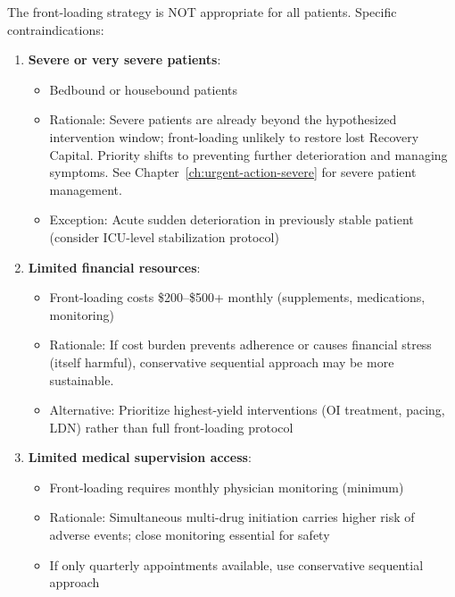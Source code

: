 \begin{warning}
\label{warn:front-loading-contraindications}

The front-loading strategy is NOT appropriate for all patients. Specific contraindications:

\begin{enumerate}
    \item \textbf{Severe or very severe patients}:
    \begin{itemize}
        \item Bedbound or housebound patients
        \item Rationale: Severe patients are already beyond the hypothesized intervention window; front-loading unlikely to restore lost Recovery Capital. Priority shifts to preventing further deterioration and managing symptoms. See Chapter~\ref{ch:urgent-action-severe} for severe patient management.
        \item Exception: Acute sudden deterioration in previously stable patient (consider ICU-level stabilization protocol)
    \end{itemize}

    \item \textbf{Limited financial resources}:
    \begin{itemize}
        \item Front-loading costs \$200--\$500+ monthly (supplements, medications, monitoring)
        \item Rationale: If cost burden prevents adherence or causes financial stress (itself harmful), conservative sequential approach may be more sustainable.
        \item Alternative: Prioritize highest-yield interventions (OI treatment, pacing, LDN) rather than full front-loading protocol
    \end{itemize}

    \item \textbf{Limited medical supervision access}:
    \begin{itemize}
        \item Front-loading requires monthly physician monitoring (minimum)
        \item Rationale: Simultaneous multi-drug initiation carries higher risk of adverse events; close monitoring essential for safety
        \item If only quarterly appointments available, use conservative sequential approach
    \end{itemize}


\end{enumerate}
\end{warning}

